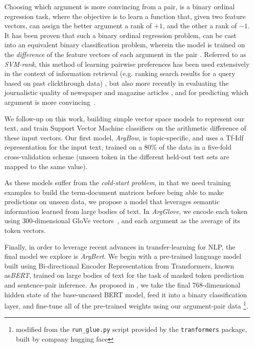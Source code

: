 \documentclass[runningheads]{llncs}
\begin{document}

Choosing which argument is more convincing from a pair, is a binary 
ordinal regression task, where the objective is to learn a function that, given 
two feature vectors, can assign the better argument a rank of $+1$, and the 
other a rank of $-1$.   
It has been proven that such a binary ordinal regression problem, can be cast 
into an equivalent binary classification problem, wherein the model is trained 
on the \textit{difference} of the feature vectors of each argument in the pair 
\cite{herbrich_support_1999}. 
Referred to as \textit{SVM-rank}, this method of learning pairwise preferences 
has been used extensively in the context of information retrieval (e.g. ranking 
search results for a query based on past clickthrough data) 
\cite{joachims_optimizing_2002}, but also more recently in evaluating the 
journalistic quality of newspaper and magazine articles \cite{louis_what_2013}, 
and for predicting which argument is more convincing~\cite{habernal_which_2016}.

We follow-up on this work, building simple vector space models to represent our 
text, and train Support Vector Machine classifiers on the arithmetic difference 
of these input vectors. Our first model, \textit{ArgBow}, is topic-specific, 
and uses a Tf-Idf representation for the input text, trained on a 80\% of the 
data in a five-fold cross-validation scheme (unseen token in the different 
held-out test sets are mapped to the same value). 

As these models suffer from the \textit{cold-start problem}, in that we need 
training examples to build the term-document matrices before being able to make 
predictions on unseen data, we propose a model that leverages semantic 
information learned from large bodies of text. In \textit{ArgGlove}, we encode 
each token using 300-dimensional GloVe vectors~\cite{pennington_glove:_2014}, 
and each argument as the average of its token vectors. 

Finally, in order to leverage recent advances in transfer-learning for NLP, the 
final model we explore is \textit{ArgBert}.
We begin with a pre-trained language model built using  Bi-directional Encoder 
Representation from Transformers, known as\textit{BERT}\cite{devlin_bert_2018}, 
trained on large bodies of text for the task of masked token prediction and 
sentence-pair inference. 
As proposed in \cite{toledo_automatic_2019}, we take the final 768-dimensional 
hidden state of the base-uncased BERT model, feed it into a binary 
classification layer, and fine-tune all of the pre-trained weights 
using our argument-pair data 
\footnote{modified from the \verb|run_glue.py| 
script provided by the \verb|tranformers| package, built by company hugging 
face}.
\end{document}
